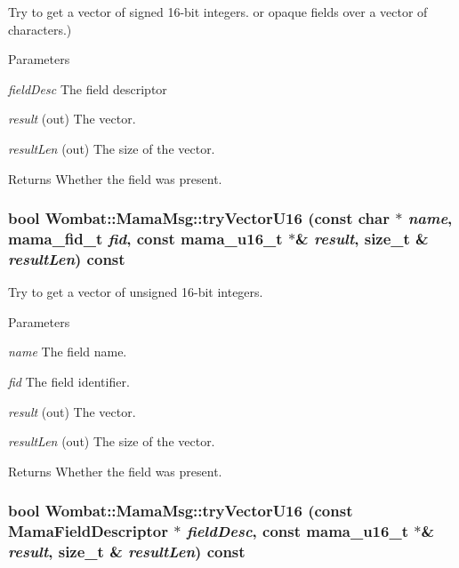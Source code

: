 Try to get a vector of signed 16-\/bit integers. or opaque fields over a vector of characters.) 
\begin{DoxyParams}{Parameters}
\item[{\em fieldDesc}]The field descriptor \item[{\em result}](out) The vector. \item[{\em resultLen}](out) The size of the vector. \end{DoxyParams}
\begin{DoxyReturn}{Returns}
Whether the field was present. 
\end{DoxyReturn}
\hypertarget{classWombat_1_1MamaMsg_a5d20d3dd7e4b9ec2468b7a145765330f}{
\subsubsection[{tryVectorU16}]{\setlength{\rightskip}{0pt plus 5cm}bool Wombat::MamaMsg::tryVectorU16 (const char $\ast$ {\em name}, \/  mama\_\-fid\_\-t {\em fid}, \/  const mama\_\-u16\_\-t $\ast$\& {\em result}, \/  size\_\-t \& {\em resultLen}) const}}
\label{classWombat_1_1MamaMsg_a5d20d3dd7e4b9ec2468b7a145765330f}


Try to get a vector of unsigned 16-\/bit integers. 
\begin{DoxyParams}{Parameters}
\item[{\em name}]The field name. \item[{\em fid}]The field identifier. \item[{\em result}](out) The vector. \item[{\em resultLen}](out) The size of the vector. \end{DoxyParams}
\begin{DoxyReturn}{Returns}
Whether the field was present. 
\end{DoxyReturn}
\hypertarget{classWombat_1_1MamaMsg_a79bbe7b1596260718af5c08542b85143}{
\subsubsection[{tryVectorU16}]{\setlength{\rightskip}{0pt plus 5cm}bool Wombat::MamaMsg::tryVectorU16 (const {\bf MamaFieldDescriptor} $\ast$ {\em fieldDesc}, \/  const mama\_\-u16\_\-t $\ast$\& {\em result}, \/  size\_\-t \& {\em resultLen}) const}}
\label{classWombat_1_1MamaMsg_a79bbe7b1596260718af5c08542b85143}


